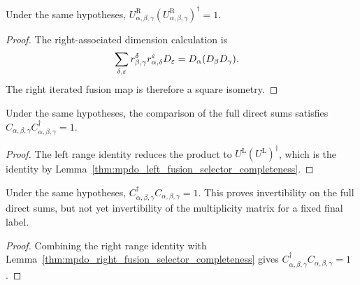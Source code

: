 \begin{lemma}%
    \label{thm:mpdo_right_fusion_selector_completeness}
    \leanok
    Under the same hypotheses,
    $U^{\mathrm R}_{\alpha,\beta,\gamma}
        (U^{\mathrm R}_{\alpha,\beta,\gamma})^{\dagger}=1$.
\end{lemma}
\begin{proof}\leanok
    The right-associated dimension calculation is
    \begin{align}
        \sum_{\delta,\varepsilon}
        r_{\beta,\gamma}^{\delta}r_{\alpha,\delta}^{\varepsilon}
        D_\varepsilon
         & =D_\alpha(D_\beta D_\gamma).
        \notag
    \end{align}
    The right iterated fusion map is therefore a square isometry.
\end{proof}

\begin{lemma}%
    \label{thm:mpdo_triple_fusion_comparison_right_inverse}
    \leanok
    Under the same hypotheses, the comparison of the full direct sums satisfies
    $C_{\alpha,\beta,\gamma}C_{\alpha,\beta,\gamma}^{\dagger}=1$.
\end{lemma}
\begin{proof}\leanok
    The left range identity reduces the product to
    $U^{\mathrm L}(U^{\mathrm L})^{\dagger}$, which is the identity by
    Lemma~\ref{thm:mpdo_left_fusion_selector_completeness}.
\end{proof}

\begin{lemma}%
    \label{thm:mpdo_triple_fusion_comparison_left_inverse}
    \leanok
    Under the same hypotheses,
    $C_{\alpha,\beta,\gamma}^{\dagger}C_{\alpha,\beta,\gamma}=1$.
    This proves invertibility on the full direct sums, but not yet
    invertibility of the multiplicity matrix for a fixed final label.
\end{lemma}
\begin{proof}\leanok
    Combining the right range identity with
    Lemma~\ref{thm:mpdo_right_fusion_selector_completeness} gives
    $C_{\alpha,\beta,\gamma}^{\dagger}C_{\alpha,\beta,\gamma}=1$.
\end{proof}

